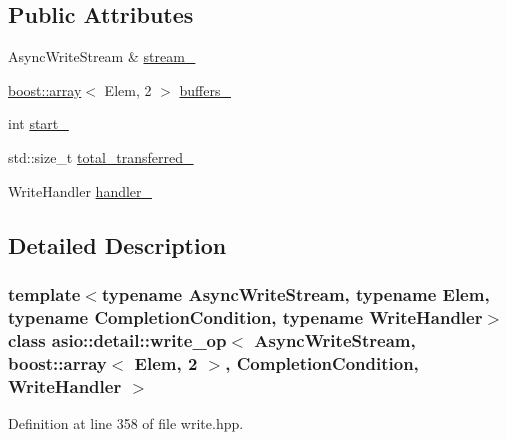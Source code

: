 \subsection*{Public Attributes}
\begin{DoxyCompactItemize}
\item 
Async\+Write\+Stream \& \hyperlink{classasio_1_1detail_1_1write__op_3_01_async_write_stream_00_01boost_1_1array_3_01_elem_00_012_018cbe26fbc46920cd28943bf9ace97230_aaf493907cc1906cd9bb8df85e532f9d2}{stream\+\_\+}
\item 
\hyperlink{classboost_1_1array}{boost\+::array}$<$ Elem, 2 $>$ \hyperlink{classasio_1_1detail_1_1write__op_3_01_async_write_stream_00_01boost_1_1array_3_01_elem_00_012_018cbe26fbc46920cd28943bf9ace97230_a63d07226ef0e760c734313b180e5e31c}{buffers\+\_\+}
\item 
int \hyperlink{classasio_1_1detail_1_1write__op_3_01_async_write_stream_00_01boost_1_1array_3_01_elem_00_012_018cbe26fbc46920cd28943bf9ace97230_a352127ccede68061fa205c9760ed9c98}{start\+\_\+}
\item 
std\+::size\+\_\+t \hyperlink{classasio_1_1detail_1_1write__op_3_01_async_write_stream_00_01boost_1_1array_3_01_elem_00_012_018cbe26fbc46920cd28943bf9ace97230_a95b60aa6c5666d4dd6d601e44a3534b7}{total\+\_\+transferred\+\_\+}
\item 
Write\+Handler \hyperlink{classasio_1_1detail_1_1write__op_3_01_async_write_stream_00_01boost_1_1array_3_01_elem_00_012_018cbe26fbc46920cd28943bf9ace97230_a3edc5e252ebfa57323e6dafc60dc724d}{handler\+\_\+}
\end{DoxyCompactItemize}


\subsection{Detailed Description}
\subsubsection*{template$<$typename Async\+Write\+Stream, typename Elem, typename Completion\+Condition, typename Write\+Handler$>$class asio\+::detail\+::write\+\_\+op$<$ Async\+Write\+Stream, boost\+::array$<$ Elem, 2 $>$,                           Completion\+Condition, Write\+Handler $>$}



Definition at line 358 of file write.\+hpp.



